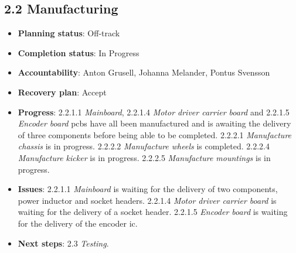 
\subsection*{2.2 Manufacturing}
\begin{itemize}
    \item \textbf{Planning status}: Off-track 
    \item \textbf{Completion status}: In Progress
    \item \textbf{Accountability}: Anton Grusell, Johanna Melander, Pontus Svensson
    \item \textbf{Recovery plan}: Accept
    \item \textbf{Progress}: 2.2.1.1 \textit{Mainboard}, 2.2.1.4 \textit{Motor driver carrier board} and 2.2.1.5 \textit{Encoder board} \acp{pcb} have all been manufactured and is awaiting the delivery of three components before being able to be completed. 2.2.2.1 \textit{Manufacture chassis} is in progress. 2.2.2.2 \textit{Manufacture wheels} is completed. 2.2.2.4 \textit{Manufacture kicker} is in progress. 2.2.2.5 \textit{Manufacture mountings} is in progress.
    \item \textbf{Issues}: 2.2.1.1 \textit{Mainboard} is waiting for the delivery of two components, power inductor and socket headers. 2.2.1.4 \textit{Motor driver carrier board} is waiting for the delivery of a socket header. 2.2.1.5 \textit{Encoder board} is waiting for the delivery of the encoder \ac{ic}.
    \item \textbf{Next steps}: 2.3 \textit{Testing}. 
\end{itemize}


